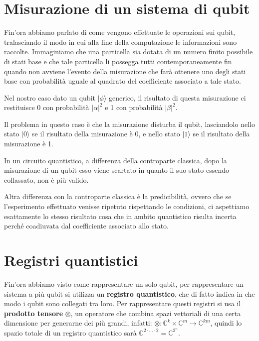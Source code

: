 \section{Misurazione di un sistema di qubit}
Fin'ora abbiamo parlato di come vengono effettuate le operazioni sui qubit, tralasciando il modo in cui alla fine della computazione le informazioni sono raccolte. Immaginiamo che una particella sia dotata di un numero finito possibile di stati base e che tale particella li possegga tutti contemporaneamente fin quando non avviene l'evento della misurazione che farà ottenere uno degli stati base con probabilità uguale al quadrato del coefficiente associato a tale stato.

Nel nostro caso dato un qubit \(| \phi \rangle \) generico, il risultato di questa misurazione ci restituisce 0 con probabilità \( |\alpha|^2 \) e 1 con probabilità \( |\beta|^2 \).

Il problema in questo caso è che la misurazione disturba il qubit, lasciandolo nello stato \( | 0 \rangle \)  se il risultato della misurazione è 0, e nello stato \( | 1 \rangle \)  se il risultato della misurazione è 1.

In un circuito quantistico, a differenza della controparte classica, dopo la misurazione di un qubit esso viene scartato in quanto il suo stato essendo collassato, non è più valido.

Altra differenza con la controparte classica è la predicibilità, ovvero che se l'esperimento effettuato venisse ripetuto rispettando le condizioni, ci aspettiamo esattamente lo stesso risultato cosa che in ambito quantistico risulta incerta perché coadiuvata dal coefficiente associato allo stato.

\section{Registri quantistici}
Fin'ora abbiamo visto come rappresentare un solo qubit, per rappresentare un sistema a più qubit si utilizza un \textbf{registro quantistico}, che di fatto indica in che modo i qubit sono collegati tra loro. Per rappresentare questi registri si usa il \textbf{prodotto tensore} \( \otimes \), un operatore che combina spazi vettoriali di una certa dimensione per generarne dei più grandi, infatti: \( \otimes: \mathbb{C}^k \times \mathbb{C}^m \rightarrow \mathbb{C}^{km} \), quindi lo spazio totale di un registro quantistico sarà \( \mathbb{C}^{2 \cdot...\cdot 2} = \mathbb{C}^{2^n} \).

